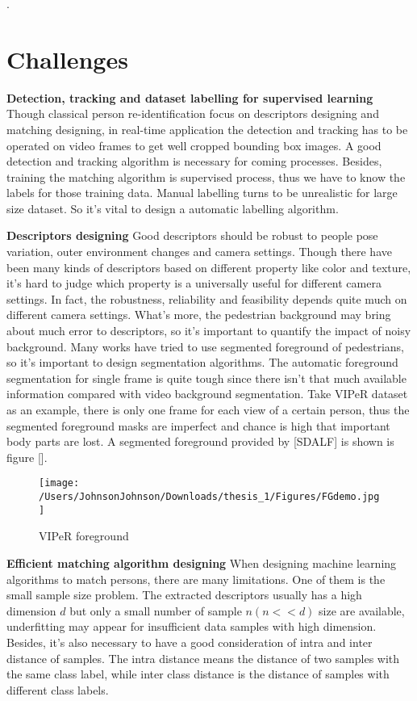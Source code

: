 .

\section{Challenges}

\textbf{Detection, tracking and dataset labelling for supervised learning} Though classical person re-identification focus on descriptors designing and matching designing, in real-time application the detection and tracking has to be operated on video frames to get well cropped bounding box images. A good detection and tracking algorithm is necessary for coming processes. Besides, training the matching algorithm is supervised process, thus we have to know the labels for those training data. Manual labelling turns to be unrealistic for large size dataset. So it's vital to design a automatic labelling algorithm.

\textbf{Descriptors designing} Good descriptors should be robust to people pose variation, outer environment changes and camera settings. Though there have been many kinds of descriptors based on different property like color and texture, it's hard to judge which property is a universally useful for different camera settings. In fact, the robustness, reliability and feasibility depends quite much on different camera settings. What's more, the pedestrian background may bring about much error to descriptors, so it's important to quantify the impact of noisy background. Many works have tried to use segmented foreground of pedestrians, so it's important to design segmentation algorithms. The automatic foreground segmentation for single frame is quite tough since there isn't that much available information compared with video background segmentation. Take VIPeR dataset as an example, there is only one frame for each view of a certain person, thus the segmented foreground masks are imperfect and chance is high that important body parts are lost. A segmented foreground provided by [SDALF] is shown is figure [].
\begin{figure}[H]
\centering
\texttt{[image: /Users/JohnsonJohnson/Downloads/thesis\_1/Figures/FGdemo.jpg]}
\vspace{-3em}
\caption{VIPeR foreground}
\end{figure}
\textbf{Efficient matching algorithm designing} 	
When designing machine learning algorithms to match persons, there are many limitations. One of them is the small sample size problem. The extracted descriptors usually has a high dimension $d$ but only a small number of sample $n(n<<d)$ size are available, underfitting may appear for insufficient data samples with high dimension. Besides, it's also necessary to have a good consideration of intra and inter distance of samples.
The intra distance means the distance of two samples with the same class label, while inter class distance is the distance of samples with different class labels. 

